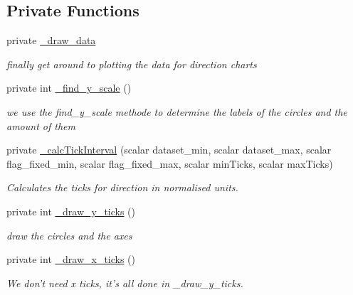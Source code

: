 \subsection*{Private Functions}
\label{_amgrp8d29cff216bafa3117e21883ea7c6b5f}
 \begin{DoxyCompactItemize}
\item 
\hypertarget{classChart_1_1Direction_af97c0fecf23820586656d100aed65008}{
private \hyperlink{classChart_1_1Direction_af97c0fecf23820586656d100aed65008}{\_\-draw\_\-data}}
\label{classChart_1_1Direction_af97c0fecf23820586656d100aed65008}

\begin{DoxyCompactList}\small\item\em finally get around to plotting the data for direction charts \item\end{DoxyCompactList}\item 
private int \hyperlink{classChart_1_1Direction_ad33ea739bd5ceb8b48809028c489f119}{\_\-find\_\-y\_\-scale} ()
\begin{DoxyCompactList}\small\item\em we use the find\_\-y\_\-scale methode to determine the labels of the circles and the amount of them \item\end{DoxyCompactList}\item 
private \hyperlink{classChart_1_1Direction_a6766001399b56ba88e61f7ca0db50922}{\_\-calcTickInterval} (scalar dataset\_\-min, scalar dataset\_\-max, scalar flag\_\-fixed\_\-min, scalar flag\_\-fixed\_\-max, scalar minTicks, scalar maxTicks)
\begin{DoxyCompactList}\small\item\em Calculates the ticks for direction in normalised units. \item\end{DoxyCompactList}\item 
private int \hyperlink{classChart_1_1Direction_aae701e9961733ae43e068acbad3e139a}{\_\-draw\_\-y\_\-ticks} ()
\begin{DoxyCompactList}\small\item\em draw the circles and the axes \item\end{DoxyCompactList}\item 
private int \hyperlink{classChart_1_1Direction_a4803bef9580feed235401ff290459cce}{\_\-draw\_\-x\_\-ticks} ()
\begin{DoxyCompactList}\small\item\em We don't need x ticks, it's all done in \_\-draw\_\-y\_\-ticks. \item\end{DoxyCompactList}\item 

\end{DoxyCompactItemize}
